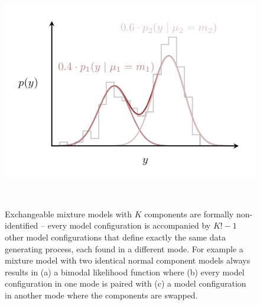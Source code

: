 \documentclass[
  letterpaper,
  DIV=11,
  numbers=noendperiod]{scrartcl}
\begin{document}
\begin{figure}
\begin{minipage}{0.45\linewidth}
{\captionsetup{labelsep=none}\includegraphics{figures/label_switching/config_one/config_one.pdf}

}

\subcaption{\label{fig-label-switching-1}}

\end{minipage}%
%
\begin{minipage}{0.45\linewidth}


\subcaption{\label{fig-label-switching-2}}

\end{minipage}%
%
\begin{minipage}{0.05\linewidth}
~\end{minipage}%

\caption{\label{fig-label-switching}Exchangeable mixture models with
\(K\) components are formally non-identified -- every model
configuration is accompanied by \(K! - 1\) other model configurations
that define exactly the same data generating process, each found in a
different mode. For example a mixture model with two identical normal
component models always results in (a) a bimodal likelihood function
where (b) every model configuration in one mode is paired with (c) a
model configuration in another mode where the components are swapped.}

\end{figure}%
\end{document}

